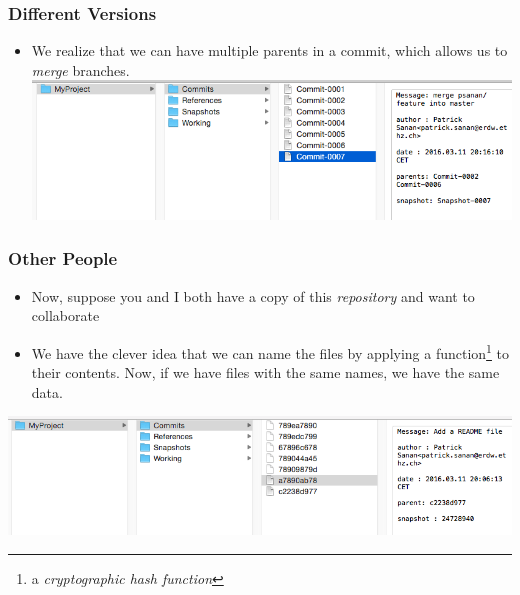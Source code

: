 \documentclass{beamer}
\begin{document}
\begin{frame}[fragile]
\frametitle{Different Versions}
\begin{itemize}
\item We realize that we can have multiple parents in a commit, which allows us to \emph{merge} branches.
\includegraphics[scale=0.4]{branch3.png}
\end{itemize}
\end{frame}

\begin{frame}[fragile]
\frametitle{Other People}
\begin{itemize}
\item Now, suppose you and I both have a copy of this \emph{repository} and want to collaborate
\item We have the clever idea that we can name the files by applying a function\footnote{a \emph{cryptographic hash function}} to their contents. Now, if we have files with the same names, we have the same data.
\end{itemize}
\includegraphics[scale=0.4]{remote1.png}\\
\vspace{10px}
\end{frame}
\end{document}
